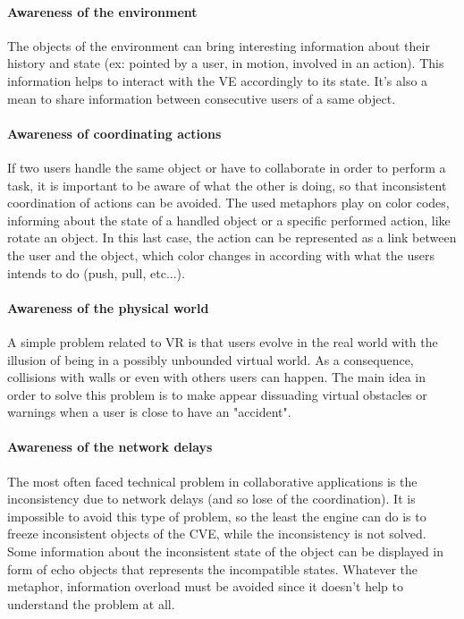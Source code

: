 \documentclass[a4paper]{article}
\begin{document}
\paragraph{Awareness of the environment}
The objects of the environment can bring interesting information about their history and state (ex: pointed by a user, in motion, involved in an action). This information helps to interact with the VE accordingly to its state. It's also a mean to share information between consecutive users of a same object.

\paragraph{Awareness of coordinating actions}
If two users handle the same object or have to collaborate in order to perform a task, it is important to be aware of what the other is doing, so that inconsistent coordination of actions can be avoided. The used metaphors play on color codes, informing about the state of a handled object or a specific performed action, like rotate an object. In this last case, the action can be represented as a link between the user and the object, which color changes in according with what the users intends to do (push, pull, etc...).

\paragraph{Awareness of the physical world}
A simple problem related to VR is that users evolve in the real world with the illusion of being in a possibly unbounded virtual world. As a consequence, collisions with walls or even with others users can happen. The main idea in order to solve this problem is to make appear dissuading virtual obstacles or warnings when a user is close to have an "accident". 

\paragraph{Awareness of the network delays}
The most often faced technical problem in collaborative applications is the inconsistency due to network delays (and so lose of the coordination). It is impossible to avoid this type of problem, so the least the engine can do is to freeze inconsistent objects of the CVE, while the inconsistency is not solved. Some information about the inconsistent state of the object can be displayed in form of echo objects that represents the incompatible states. Whatever the metaphor, information overload must be avoided since it doesn't help to understand the problem at all.
\end{document}
